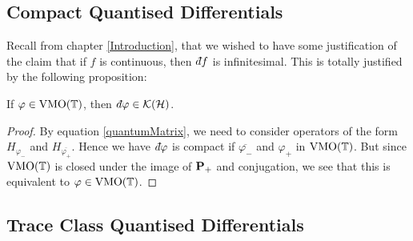 \subsection{Compact Quantised Differentials}
Recall from chapter \ref{Introduction}, that we wished to have some justification
of the claim that if $f$ is continuous, then $\qd f$ is infinitesimal. This is totally
justified by the following proposition:
\begin{proposition}
    If $\varphi \in \operatorname{VMO}(\mathbb{T})$, then $\qd \varphi \in \mathcal{K}(\Hilb)$.
\end{proposition}
\begin{proof}
    By equation \ref{quantumMatrix}, we need to consider operators of the form $H_{\varphi_-}$
    and $H_{\overline{\varphi_+}}$. Hence we have $\qd \varphi$ is compact
    if $\overline{\varphi_-}$ and $\varphi_+$ in $\operatorname{VMO}(\mathbb{T})$. But 
    since $\operatorname{VMO}(\mathbb{T})$ is closed under the image of $\mathbf{P}_+$ and conjugation,
    we see that this is equivalent to $\varphi \in \operatorname{VMO}(\mathbb{T})$. 
\end{proof}


\subsection{Trace Class Quantised Differentials}


